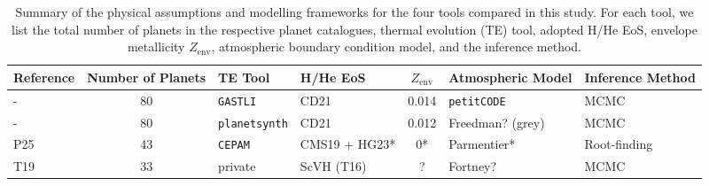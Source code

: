 \begin{table}[!t]
    \centering
    \begin{tabular}{lcllcll}
    \hline
    \hline
    Reference & Number of Planets    & TE Tool              & H/He EoS      & $Z_{\text{env}}$ & Atmospheric Model  & Inference Method     \\
    \hline
    -         & 80                   & \texttt{GASTLI}      & CD21          & 0.014            & \texttt{petitCODE} & MCMC \\
    -         & 80                   & \texttt{planetsynth} & CD21          & 0.012            & Freedman? (grey)   & MCMC \\
    P25       & 43                   & \texttt{CEPAM}       & CMS19 + HG23* & 0*               & Parmentier*        & Root-finding       \\
    T19       & 33                   & private              & ScVH (T16)    & ?                & Fortney?           & MCMC       \\
    \hline
    \end{tabular}
    \caption{Summary of the physical assumptions and modelling frameworks for the four tools compared in this study. For each tool, we list the total number of planets in the respective planet catalogues, thermal evolution (TE) tool, adopted H/He EoS, envelope metallicity $Z_{\text{env}}$, atmospheric boundary condition model, and the inference method.}
    \label{tab:EoS_and_atm_model}
\end{table}